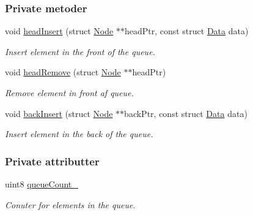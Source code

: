 \subsubsection*{Private metoder}
\begin{DoxyCompactItemize}
\item 
void \hyperlink{class_queue_acfcf4994d1169caad1265663e4a12ada}{head\+Insert} (struct \hyperlink{queue_8c_struct_node}{Node} $\ast$$\ast$head\+Ptr, const struct \hyperlink{queue_8h_struct_data}{Data} data)
\begin{DoxyCompactList}\small\item\em Insert element in the front of the queue. \end{DoxyCompactList}\item 
void \hyperlink{class_queue_ae54666c891fd21d5497f48c385a00b74}{head\+Remove} (struct \hyperlink{queue_8c_struct_node}{Node} $\ast$$\ast$head\+Ptr)
\begin{DoxyCompactList}\small\item\em Remove element in front af queue. \end{DoxyCompactList}\item 
void \hyperlink{class_queue_a8d1efbbc4aca857d5bcbf0ab2625e1dc}{back\+Insert} (struct \hyperlink{queue_8c_struct_node}{Node} $\ast$$\ast$back\+Ptr, const struct \hyperlink{queue_8h_struct_data}{Data} data)
\begin{DoxyCompactList}\small\item\em Insert element in the back of the queue. \end{DoxyCompactList}\end{DoxyCompactItemize}
\subsubsection*{Private attributter}
\begin{DoxyCompactItemize}
\item 
uint8 \hyperlink{class_queue_ad260f9ccca00e80d161bbf3e70c3ffa6}{queue\+Count\+\_\+}
\begin{DoxyCompactList}\small\item\em Conuter for elements in the queue. \end{DoxyCompactList}\end{DoxyCompactItemize}
